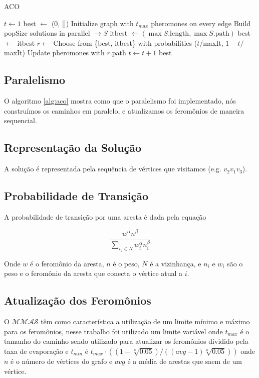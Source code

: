 \documentclass[10pt,twocolumn,letterpaper]{article}
\begin{document}
\begin{algorithm}
   \caption{ACO}\label{alg:aco}
   \begin{algorithmic}
      \State $t \gets 1$
      \State best $\gets$ (0, [])
      \State Initialize graph with $t_{max}$ pheromones on every edge
      \State Build popSize solutions in parallel $\to S$
      \State itbest $\gets (\max{S}.\text{length}, \max{S}.\text{path})$
      \State best $\gets$ itbest
      \EndIf
      \State $r \gets $ Choose from \{best, itbest\} with probabilities ($t/$maxIt, $1-t/$maxIt)
      \State Update pheromones with $r.$path
      \State $t \gets t + 1$
      \EndWhile
      \State \Return best
   \end{algorithmic}
\end{algorithm}

\subsection{Paralelismo}

O algoritmo \ref{alg:aco} mostra como que o paralelismo foi implementado, nós construímos os caminhos em paralelo, e atualizamos os feromônios de maneira sequencial.

\subsection{Representação da Solução}

A solução é representada pela sequência de vértices que visitamos (e.g. $v_2v_1v_3$).

\subsection{Probabilidade de Transição}

A probabilidade de transição por uma aresta é dada pela equação

$$
   \frac{w^\alpha n^\beta}{\sum_{v_i \in N} w_i^\alpha n_i^\beta}
$$

Onde $w$ é o feromônio da aresta, $n$ é o peso, $N$ é a vizinhança, e $n_i$ e $w_i$ são o peso e o feromônio da aresta que conecta o vértice atual a $i$.

\subsection{Atualização dos Feromônios}

O $\mathcal{MMAS}$ têm como característica a utilização de um limite mínimo e máximo para os feromônios, nesse trabalho foi utilizado um limite variável onde $t_{max}$ é o tamanho do caminho sendo utilizado para atualizar os feromônios dividido pela taxa de evaporação e $t_{min}$ é $t_{max}\cdot((1-\sqrt[n]{0.05})/((avg-1)\sqrt[n]{0.05}))$ onde $n$ é o número de vértices do grafo e $avg$ é a média de arestas que saem de um vértice.
\end{document}
